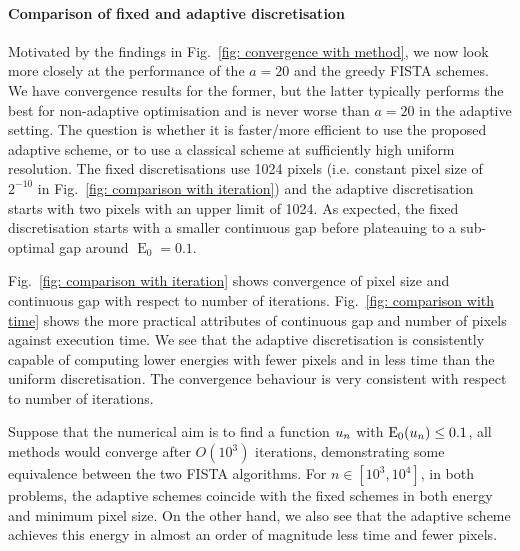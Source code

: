 \documentclass[smallextended]{svjour3}
\newcommand{\op}[1]{\operatorname{#1}}
\newcommand{\1}{\F{1}}
\newcommand*{\var}[1]{%
	\IfEqCase{#1}{%
		{0}{u}%
		{1}{v}%
		{2}{w}%
	}[u#1]%
}
\begin{document}
	\paragraph{Comparison of fixed and adaptive discretisation}
	Motivated by the findings in Fig.~\ref{fig: convergence with method}, we now look more closely at the performance of the $a=20$ and the greedy FISTA schemes. We have convergence results for the former, but the latter typically performs the best for non-adaptive optimisation and is never worse than $a=20$ in the adaptive setting. The question is whether it is faster/more efficient to use the proposed adaptive scheme, or to use a classical scheme at sufficiently high uniform resolution. The fixed discretisations use 1024 pixels (i.e. constant pixel size of $2^{-10}$ in Fig.~\ref{fig: comparison with iteration}) and the adaptive discretisation starts with two pixels with an upper limit of 1024. As expected, the fixed discretisation starts with a smaller continuous gap before plateauing to a sub-optimal gap around $\op{E}_0=0.1$.
	
	Fig.~\ref{fig: comparison with iteration} shows convergence of pixel size and continuous gap with respect to number of iterations. Fig.~\ref{fig: comparison with time} shows the more practical attributes of continuous gap and number of pixels against execution time. We see that the adaptive discretisation is consistently capable of computing lower energies with fewer pixels and in less time than the uniform discretisation. The convergence behaviour is very consistent with respect to number of iterations.
	
	Suppose that the numerical aim is to find a function $\var0_n$ with $\op{E}_0(\var0_n)\leq 0.1$, all methods would converge after $O(10^3)$ iterations, demonstrating some equivalence between the two FISTA algorithms. For $n\in[10^3,10^4]$, in both problems, the adaptive schemes coincide with the fixed schemes in both energy and minimum pixel size. On the other hand, we also see that the adaptive scheme achieves this energy in almost an order of magnitude less time and fewer pixels.
	
\end{document}

